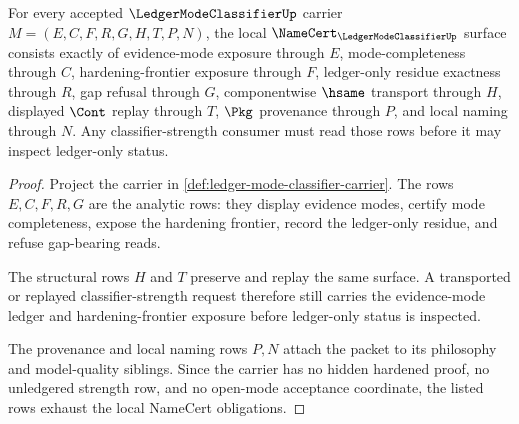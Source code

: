 \begin{theorem}
\label{thm:ledger-mode-classifier-namecert-obligations}
For every accepted $\LedgerModeClassifierUp$ carrier $M=(E,C,F,R,G,H,T,P,N)$, the local $\NameCert_{\LedgerModeClassifierUp}$ surface consists exactly of evidence-mode exposure through $E$, mode-completeness through $C$, hardening-frontier exposure through $F$, ledger-only residue exactness through $R$, gap refusal through $G$, componentwise $\hsame$ transport through $H$, displayed $\Cont$ replay through $T$, $\Pkg$ provenance through $P$, and local naming through $N$. Any classifier-strength consumer must read those rows before it may inspect ledger-only status.
\end{theorem}
\begin{proof}
Project the carrier in \autoref{def:ledger-mode-classifier-carrier}. The rows $E,C,F,R,G$ are the analytic rows: they display evidence modes, certify mode completeness, expose the hardening frontier, record the ledger-only residue, and refuse gap-bearing reads.

The structural rows $H$ and $T$ preserve and replay the same surface. A transported or replayed classifier-strength request therefore still carries the evidence-mode ledger and hardening-frontier exposure before ledger-only status is inspected.

The provenance and local naming rows $P,N$ attach the packet to its philosophy and model-quality siblings. Since the carrier has no hidden hardened proof, no unledgered strength row, and no open-mode acceptance coordinate, the listed rows exhaust the local NameCert obligations.
\end{proof}

